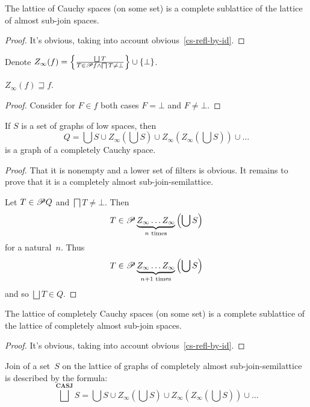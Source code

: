 \begin{prop}
The lattice of Cauchy spaces (on some set) is a complete sublattice of the lattice of almost sub-join spaces.
\end{prop}

\begin{proof}
It's obvious, taking into account obvious~\ref{cs-refl-by-id}.
\end{proof}

Denote $Z_{\infty}(f)=\setcond{\bigsqcup T}{T\in\subsets f\land\bigsqcap T\ne\bot}\cup\{\bot\}$.

\begin{prop}
$Z_{\infty}(f)\sqsupseteq f$.
\end{prop}

\begin{proof}
Consider for $F\in f$ both cases $F=\bot$ and $F\ne\bot$.
\end{proof}

\begin{lem}
If $S$ is a set of graphs of low spaces, then
\[
Q = \bigcup S \cup Z_{\infty}\left(\bigcup S\right) \cup Z_{\infty}\left(Z_{\infty}\left(\bigcup S\right)\right) \cup \dots
\]
is a graph of a completely Cauchy space.
\end{lem}

\begin{proof}
That it is nonempty and a lower set of filters is obvious. It remains to prove that it is a completely almost sub-join-semilattice.

Let $T\in\mathscr{P} Q$ and $\bigsqcap T\ne\bot$.
Then
\[
T\in\mathscr{P} \underbrace{Z_{\infty}\dots Z_{\infty}}_{n\text{ times}}\left(\bigcup S\right)
\]
for a natural~$n$. Thus
\[
T\in\mathscr{P} \underbrace{Z_{\infty}\dots Z_{\infty}}_{n+1\text{ times}}\left(\bigcup S\right)
\]
and so $\bigsqcup T\in Q$.
\end{proof}

\begin{prop}
The lattice of completely Cauchy spaces (on some set) is a complete sublattice of the lattice of completely almost sub-join spaces.
\end{prop}

\begin{proof}
It's obvious, taking into account obvious~\ref{cs-refl-by-id}.
\end{proof}

\begin{prop}
Join of a set~$S$ on the lattice of graphs of completely almost sub-join-semilattice is described by the formula:
\[
\bigsqcup^{\mathbf{CASJ}}S=\bigcup S \cup Z_{\infty}\left(\bigcup S\right) \cup Z_{\infty}\left(Z_{\infty}\left(\bigcup S\right)\right) \cup \dots
\]
\end{prop}

